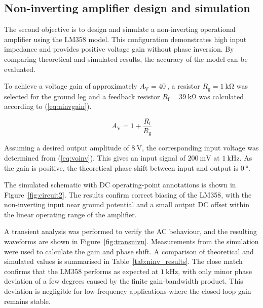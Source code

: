 \documentclass[conference]{IEEEtran}
\newcommand{\Ax}[1]{A_\mathrm{#1}}
\newcommand{\Rx}[1]{R_\mathrm{#1}}
\begin{document}


\subsection{Non-inverting amplifier design and simulation}

The second objective is to design and simulate a non-inverting operational amplifier using the LM358 model.  
This configuration demonstrates high input impedance and provides positive voltage gain without phase inversion.  
By comparing theoretical and simulated results, the accuracy of the model can be evaluated.

To achieve a voltage gain of approximately \(\Ax{V}=\qty{40}{}\), a resistor \(\Rx{g}=\qty{1}{\kilo\ohm}\) was selected for the ground leg and a feedback resistor \(\Rx{f}=\qty{39}{\kilo\ohm}\) was calculated according to (\ref{eq:ninvgain}).  

\begin{equation}
\label{eq:ninvgain}
    \Ax{V} = 1 + \frac{\Rx{f}}{\Rx{g}}
\end{equation}

Assuming a desired output amplitude of \(\qty{8}{\volt}\), the corresponding input voltage was determined from (\ref{eq:voinv}).  
This gives an input signal of \(\qty{200}{\milli\volt}\) at \(\qty{1}{\kilo\hertz}\).  
As the gain is positive, the theoretical phase shift between input and output is \(\qty{0}{\degree}\).

The simulated schematic with DC operating-point annotations is shown in Figure~\ref{fig:circuit2}.  
The results confirm correct biasing of the LM358, with the non-inverting input near ground potential and a small output DC offset within the linear operating range of the amplifier.  

A transient analysis was performed to verify the AC behaviour, and the resulting waveforms are shown in Figure~\ref{fig:transnivn}.  
Measurements from the simulation were used to calculate the gain and phase shift.  
A comparison of theoretical and simulated values is summarised in Table~\ref{tab:ninv_results}.  
The close match confirms that the LM358 performs as expected at \(\qty{1}{\kilo\hertz}\), with only minor phase deviation of a few degrees caused by the finite gain-bandwidth product.  
This deviation is negligible for low-frequency applications where the closed-loop gain remains stable.
\end{document}
